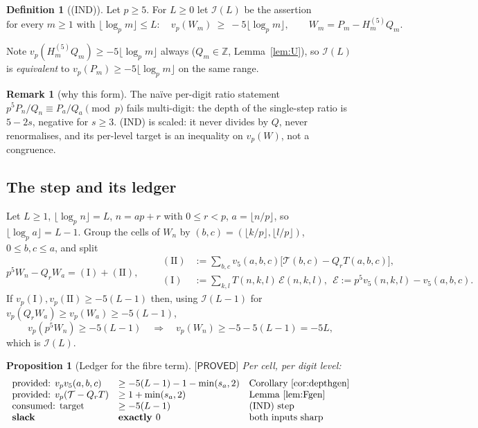 \documentclass[11pt,reqno]{amsart}
\theoremstyle{plain}
\newtheorem{proposition}[theorem]{Proposition}
\theoremstyle{definition}
\newtheorem{definition}[theorem]{Definition}
\newtheorem{remark}[theorem]{Remark}
\theoremstyle{remark}
\numberwithin{equation}{section}
\newcommand{\ZZ}{\mathbb{Z}}
\newcommand{\Tcal}{\mathcal{T}}
\newcommand{\Ecal}{\mathcal{E}}
\newcommand{\vfive}{v_5}
\newcommand{\PROVED}{\textsf{[PROVED]}}
\begin{document}
\begin{definition}[(IND)]\label{def:IND}
Let $p\ge5$. For $L\ge0$ let $\mathcal I(L)$ be the assertion
\[
\text{for every }m\ge1\text{ with }\lfloor\log_pm\rfloor\le L:\quad
v_p(W_m)\ \ge\ -5\lfloor\log_pm\rfloor,\qquad W_m=P_m-H^{(5)}_mQ_m .
\]
\end{definition}

Note $v_p(H^{(5)}_mQ_m)\ge-5\lfloor\log_pm\rfloor$ always ($Q_m\in\ZZ$, Lemma~\ref{lem:U}), so
$\mathcal I(L)$ is \emph{equivalent} to $v_p(P_m)\ge-5\lfloor\log_pm\rfloor$ on the same range.

\begin{remark}[why this form]
The na\"ive per-digit ratio statement $p^5P_n/Q_n\equiv P_a/Q_a\pmod p$ fails multi-digit: the
depth of the single-step ratio is $5-2s$, negative for $s\ge3$. (IND) is scaled: it never
divides by $Q$, never renormalises, and its per-level target is an inequality on $v_p(W)$, not
a congruence.
\end{remark}

\subsection{The step and its ledger}

Let $L\ge1$, $\lfloor\log_pn\rfloor=L$, $n=ap+r$ with $0\le r<p$, $a=\lfloor n/p\rfloor$, so
$\lfloor\log_pa\rfloor=L-1$. Group the cells of $W_n$ by
$(b,c)=(\lfloor k/p\rfloor,\lfloor l/p\rfloor)$, $0\le b,c\le a$, and split
\begin{equation}\label{eq:split}
p^5W_n-Q_rW_a=(\mathrm I)+(\mathrm{II}),\qquad
\begin{aligned}
(\mathrm{II})&:=\sum_{b,c}\vfive(a,b,c)\bigl[\Tcal(b,c)-Q_rT(a,b,c)\bigr],\\
(\mathrm I)&:=\sum_{k,l}T(n,k,l)\,\Ecal(n,k,l),\ \
\Ecal:=p^5\vfive(n,k,l)-\vfive(a,b,c).
\end{aligned}
\end{equation}
If $v_p(\mathrm I),v_p(\mathrm{II})\ge-5(L-1)$ then, using $\mathcal I(L-1)$ for
$v_p(Q_rW_a)\ge v_p(W_a)\ge-5(L-1)$,
\[
v_p(p^5W_n)\ge-5(L-1)\quad\Longrightarrow\quad v_p(W_n)\ge-5-5(L-1)=-5L,
\]
which is $\mathcal I(L)$.

\begin{proposition}[Ledger for the fibre term]\label{prop:ledgerII}
$\PROVED$ Per cell, per digit level:
\[
\begin{array}{lll}
\text{provided: } v_p\vfive(a,b,c) & \ge-5(L-1)-1-\min(s_a,2) & \text{Corollary~\ref{cor:depthgen}}\\
\text{provided: } v_p(\Tcal-Q_rT) & \ge1+\min(s_a,2) & \text{Lemma~\ref{lem:Fgen}}\\
\text{consumed: target} & \ge-5(L-1) & \text{(IND) step}\\
\textbf{slack} & \textbf{exactly }0 & \text{both inputs sharp}
\end{array}
\]
\end{proposition}
\end{document}
